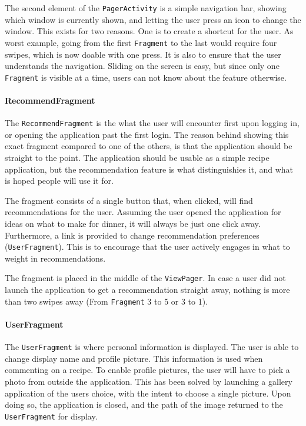 The second element of the \texttt{PagerActivity} is a simple navigation bar, showing which window is currently shown, and letting the user press an icon to change the window. This exists for two reasons. One is to create a shortcut for the user. As worst example, going from the first \texttt{Fragment} to the last would require four swipes, which is now doable with one press. It is also to ensure that the user understands the navigation. Sliding on the screen is easy, but since only one \texttt{Fragment} is visible at a time, users can not know about the feature otherwise.

\paragraph{RecommendFragment}
The \texttt{RecommendFragment} is the what the user will encounter first upon logging in, or opening the application past the first login. The reason behind showing this exact fragment compared to one of the others, is that the application should be straight to the point. The application should be usable as a simple recipe application, but the recommendation feature is what distinguishies it, and what is hoped people will use it for.

The fragment consists of a single button that, when clicked, will find recommendations for the user. Assuming the user opened the application for ideas on what to make for dinner, it will always be just one click away. Furthermore, a link is provided to change recommendation preferences (\texttt{UserFragment}). This is to encourage that the user actively engages in what to weight in recommendations.

The fragment is placed in the middle of the \texttt{ViewPager}. In case a user did not launch the application to get a recommendation straight away, nothing is more than two swipes away (From \texttt{Fragment} 3 to 5 or 3 to 1).

\paragraph{UserFragment}
The \texttt{UserFragment} is where personal information is displayed. The user is able to change display name and profile picture. This information is used when commenting on a recipe.
To enable profile pictures, the user will have to pick a photo from outside the application. This has been solved by launching a gallery application of the users choice, with the intent to choose a single picture. Upon doing so, the application is closed, and the path of the image returned to the \texttt{UserFragment} for display.

